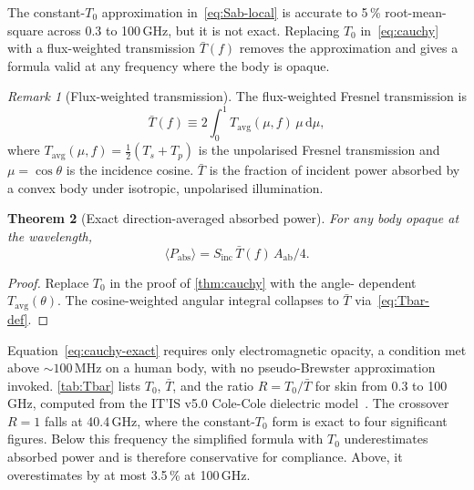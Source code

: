 \documentclass[journal,twocolumn,10pt]{IEEEtran}
\theoremstyle{plain}
\newtheorem{theorem}{Theorem}
\theoremstyle{remark}
\newtheorem{remark}[theorem]{Remark}
\newcommand{\Sinc}{S_{\mathrm{inc}}}
\newcommand{\Aab}{A_{\mathrm{ab}}}
\newcommand{\Tavg}{T_{\mathrm{avg}}}
\newcommand{\Tbar}{\bar{T}}
\newcommand{\diff}{\mathrm{d}}
\begin{document}
The constant-$T_0$ approximation in~\eqref{eq:Sab-local} is accurate
to 5\,\% root-mean-square across 0.3 to 100\,GHz, but it is not
exact. Replacing $T_0$ in~\eqref{eq:cauchy} with a flux-weighted
transmission $\Tbar(f)$ removes the approximation and gives a
formula valid at any frequency where the body is opaque.

\begin{remark}[Flux-weighted transmission]\label{def:Tbar}
The flux-weighted Fresnel transmission is
\begin{equation}\label{eq:Tbar-def}
  \Tbar(f) \equiv 2\int_0^1 \Tavg(\mu,f)\,\mu\,\diff\mu,
\end{equation}
where $\Tavg(\mu,f) = \tfrac{1}{2}(T_s + T_p)$ is the unpolarised
Fresnel transmission and $\mu = \cos\theta$ is the incidence cosine.
$\Tbar$ is the fraction of incident power absorbed by a convex body
under isotropic, unpolarised illumination.
\end{remark}

\begin{theorem}[Exact direction-averaged absorbed power]\label{thm:exact}
For any body opaque at the wavelength,
\begin{equation}\label{eq:cauchy-exact}
  \langle P_{\mathrm{abs}} \rangle = \Sinc\,\Tbar(f)\,\Aab/4.
\end{equation}
\end{theorem}

\begin{proof}
Replace $T_0$ in the proof of \cref{thm:cauchy} with the angle-
dependent $\Tavg(\theta)$. The cosine-weighted angular integral
collapses to $\Tbar$ via~\eqref{eq:Tbar-def}.
\end{proof}

Equation~\eqref{eq:cauchy-exact} requires only electromagnetic
opacity, a condition met above $\sim 100\,$MHz on a human body, with
no pseudo-Brewster approximation invoked. \cref{tab:Tbar} lists $T_0$,
$\Tbar$, and the ratio $R = T_0/\Tbar$ for skin from 0.3 to 100\,GHz,
computed from the IT'IS v5.0 Cole-Cole dielectric
model~\cite{ITISv5,Gabriel1996}. The crossover $R = 1$ falls at
40.4\,GHz, where the constant-$T_0$ form is exact to four significant
figures. Below this frequency the simplified formula with $T_0$
underestimates absorbed power and is therefore conservative for
compliance. Above, it overestimates by at most 3.5\,\% at 100\,GHz.
\end{document}
